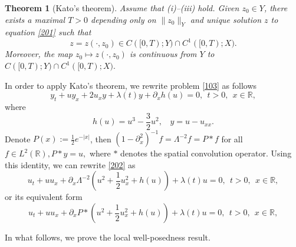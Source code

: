 \documentclass[preprint,12pt]{elsarticle}
\numberwithin{equation}{section}
\newtheorem{theorem}{Theorem}[section]
\begin{document}
\begin{theorem}[Kato's theorem\cite{Kato}]
\label{the201}  Assume that (i)--(iii) hold. Given $z_{0}\in Y$, there exists a maximal $T>0$ depending only on $\|z_{0}\|_{Y}$ and unique solution $z$ to equation \eqref{201} such that
$$z=z(\cdot,z_{0})\in C([0,T);Y)\cap C^{1}([0,T);X).$$
Moreover, the map $z_{0}\mapsto z(\cdot,z_{0})$ is continuous from $Y$ to $C([0,T);Y)\cap C^{1}([0,T);X).$
\end{theorem}

In order to apply Kato's theorem, we rewrite problem \eqref{103} as follows
\begin{equation}
y_{t}+uy_{x}+2u_{x}y+\lambda(t) y+\partial_{x}h(u)=0,\ \ t>0,\ \ x\in \mathbb{R},
\label{202}
\end{equation}
where $$h(u)=u^{3}-\frac{3}{2}u^{2},\ \ \ \ y=u-u_{xx}.$$
Denote $P(x):=\frac{1}{2}e^{-|x|}$, then $(1-\partial_{x}^{2})^{-1}f=\Lambda^{-2}f=P\ast f$ for all $f\in L^{2}(\mathbb{R}), P\ast y=u,$ where $\ast$ denotes the spatial convolution operator. Using this identity, we can rewrite \eqref{202} as
\begin{equation}
u_{t}+uu_{x}+\partial_{x}\Lambda^{-2}\left(u^{2}+\frac{1}{2}u_{x}^{2}+h(u)\right)+\lambda(t) u=0,\ \ t>0,\ \ x\in \mathbb{R},
\label{203}
\end{equation}
or its equivalent form
\begin{equation}
u_{t}+uu_{x}+\partial_{x}P\ast\left(u^{2}+\frac{1}{2}u_{x}^{2}+h(u)\right)+\lambda(t) u=0,\ \ t>0,\ \ x\in \mathbb{R},
\label{204}
\end{equation}

In what follows, we prove the local well-posedness result.
\end{document}
